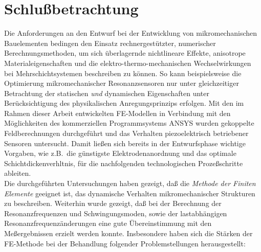 \chapter{Schlußbetrachtung}
\label{schluss}

Die Anforderungen an den Entwurf bei der Entwicklung von mikromechanischen
Bauelementen bedingen den Einsatz rechnergestützter, numerischer
Berechnungsmethoden, um sich überlagernde nichtlineare Effekte, anisotrope
Materialeigenschaften und die elektro-thermo-mechanischen Wechselwirkungen
bei Mehrschichtsystemen beschreiben zu können. So kann beispielsweise die
Optimierung mikromechanischer Resonanzsensoren nur unter gleichzeitiger
Betrachtung der statischen {\em und} dynamischen Eigenschaften unter
Berücksichtigung des physikalischen Anregungsprinzips erfolgen.
Mit den im Rahmen dieser Arbeit entwickelten FE-Modellen in Verbindung mit
den Möglichkeiten des kommerziellen Programmsystems {\sf ANSYS} wurden
gekoppelte Feldberechnungen durchgeführt und das Verhalten piezoelektrisch
betriebener Sensoren untersucht. Damit ließen sich bereits
in der Entwurfsphase wichtige Vorgaben, wie z.B.\ die günstigste
Elektrodenanordnung und das optimale Schichtdickenverhltnis, für die
nachfolgenden technologischen Prozeßschritte ableiten.\\
%
Die durchgeführten Untersuchungen haben gezeigt, daß die {\em Methode der
Finiten Elemente} geeignet ist, das dynamische Verhalten mikromechanischer
Strukturen zu beschreiben. Weiterhin wurde gezeigt, daß bei der
Berechnung der Resonanzfrequenzen und Schwingungsmoden, sowie der
lastabhängigen Resonanzfrequenzänderungen eine gute Übereinstimmung mit den
Meßergebnissen erzielt werden konnte. Insbesondere haben sich die Stärken
der FE-Methode bei der Behandlung folgender Problemstellungen herausgestellt:
%
